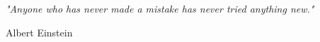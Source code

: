 
\pagestyle{empty} %

\null\vfill %

\textit{"Anyone who has never made a mistake has never tried anything new."}

\begin{flushright}
Albert Einstein 
\end{flushright}